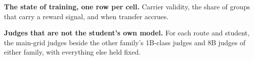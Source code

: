 \begin{table}[p]
\caption{\textbf{The state of training, one row per cell.} Carrier validity, the share of groups that carry a reward signal, and when transfer accrues.}
\label{tab:ed-time}
{\tabsize\setlength{\tabcolsep}{3pt}}
\end{table}

\begin{table}[p]
\caption{\textbf{Judges that are not the student's own model.} For each route and student, the main-grid judges beside the other family's 1B-class judges and 8B judges of either family, with everything else held fixed.}
\label{tab:judges}
{\tabsize\setlength{\tabcolsep}{3pt}}
\end{table}
